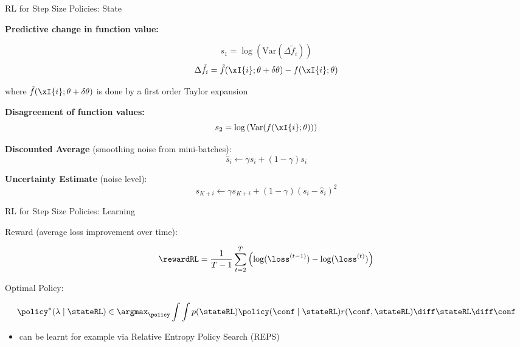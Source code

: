 \begin{frame}[c]{RL for Step Size Policies: State }

\textbf{Predictive change in function value:}

$$s_1 = \log \left( \text{Var}(\Delta \tilde{f}_i ) \right)$$
$$\Delta \tilde{f}_i = \tilde{f}(\xI{i} ; \theta + \delta \theta) - f(\xI{i} ; \theta)$$

where $\tilde{f}(\xI{i} ; \theta + \delta \theta)$ is done by a first order Taylor expansion

\pause
\smallskip
\textbf{Disagreement of function values:}
$$ s_2 = \log \left(\text{Var}(f(\xI{i} ; \theta)) \right)$$

\pause

\textbf{Discounted Average} (smoothing noise from mini-batches):
$$\hat{s}_i \leftarrow \gamma \hat{s_i} + (1 - \gamma) s_i$$

\pause

\textbf{Uncertainty Estimate} (noise level):
$$s_{K+i} \leftarrow \gamma s_{K+i} + (1-\gamma) (s_i - \hat{s}_i)^2$$


\end{frame}
\begin{frame}[c]{RL for Step Size Policies: Learning }

Reward (average loss improvement over time):

$$\rewardRL = \frac{1}{T-1} \sum_{t=2}^T \left(\log(\loss^{(t-1)}) - \log(\loss^{(t)})\right)$$

\pause

Optimal Policy:

$$\policy^*(\lambda \mid \stateRL) \in \argmax_{\policy} \int \int p(\stateRL) \policy(\conf \mid \stateRL)r(\conf,\stateRL) \diff\stateRL \diff\conf $$

\pause


\begin{itemize}
\item can be learnt for example via Relative Entropy Policy Search (REPS) 
\end{itemize}

\end{frame}
